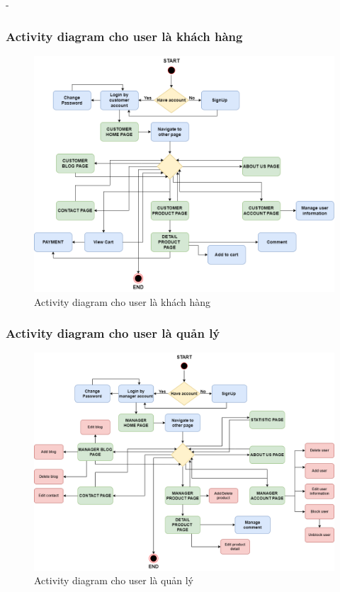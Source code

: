 \begin {list} {-}{}
\subsubsection{Activity diagram cho user là khách hàng}
\begin{figure}[h]
    \centering
    \includegraphics[scale=0.45]{images/hieu/chap-3/user-activity-diagram.png}
    \caption{Activity diagram cho user là khách hàng}
\end{figure}

\newpage
\subsubsection{Activity diagram cho user là quản lý}
\begin{figure}[h]
    \centering
    \includegraphics[scale=0.4]{images/hieu/chap-3/admin-activity-diagram.png}
    \caption{Activity diagram cho user là quản lý}
\end{figure}
\newpage

\end{list}
